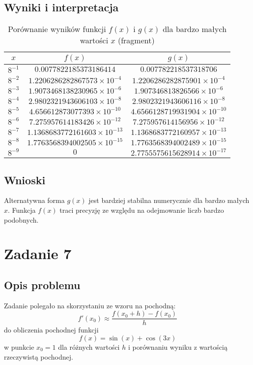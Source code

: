 \documentclass{article}
\begin{document}
\subsection{Wyniki i interpretacja}
\begin{table}[h!]
\centering
\renewcommand{\arraystretch}{1.3}
\begin{tabular}{|c|c|c|}
\hline
$x$ & $f(x)$ & $g(x)$ \\
\hline
$8^{-1}$ & $0.0077822185373186414$ & $0.007782218537318706$ \\
$8^{-2}$ & $1.2206286282867573 \times 10^{-4}$ & $1.2206286282875901 \times 10^{-4}$ \\
$8^{-3}$ & $1.9073468138230965 \times 10^{-6}$ & $1.907346813826566 \times 10^{-6}$ \\
$8^{-4}$ & $2.9802321943606103 \times 10^{-8}$ & $2.9802321943606116 \times 10^{-8}$ \\
$8^{-5}$ & $4.656612873077393 \times 10^{-10}$ & $4.6566128719931904 \times 10^{-10}$ \\
$8^{-6}$ & $7.275957614183426 \times 10^{-12}$ & $7.275957614156956 \times 10^{-12}$ \\
$8^{-7}$ & $1.1368683772161603 \times 10^{-13}$ & $1.1368683772160957 \times 10^{-13}$ \\
$8^{-8}$ & $1.7763568394002505 \times 10^{-15}$ & $1.7763568394002489 \times 10^{-15}$ \\
$8^{-9}$ & $0$ & $2.7755575615628914 \times 10^{-17}$ \\
\hline
\end{tabular}
\caption{Porównanie wyników funkcji $f(x)$ i $g(x)$ dla bardzo małych wartości $x$ (fragment)}
\end{table}

\subsection{Wnioski}
Alternatywna forma $g(x)$ jest bardziej stabilna numerycznie dla bardzo małych $x$. Funkcja $f(x)$ traci precyzję ze względu na odejmowanie liczb bardzo podobnych.

\section{Zadanie 7}
\subsection{Opis problemu}
Zadanie polegało na skorzystaniu ze wzoru na pochodną:
\[
f'(x_0) \approx \frac{f(x_0+h) - f(x_0)}{h}
\]
do obliczenia pochodnej funkcji
\[
f(x) = \sin(x) + \cos(3x)
\]
w punkcie $x_0 = 1$ dla różnych wartości $h$ i porównaniu wyniku z wartością rzeczywistą pochodnej.
\end{document}
